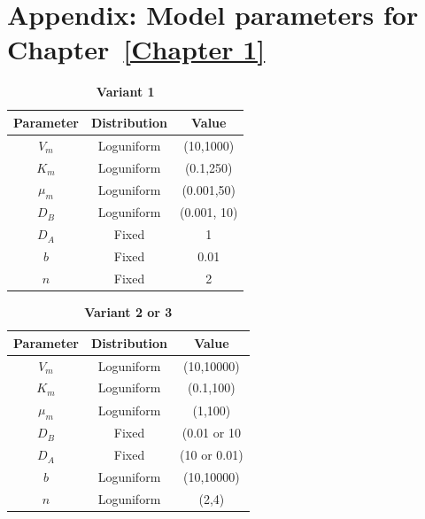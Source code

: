 \appendix
\chapter{Appendix: Model parameters for Chapter~\ref{Chapter 1}}

\begin{table}[H]
    \centering
    \caption{\textbf{Variant 1}}
    \label{tab:variant_1}
    \renewcommand{\arraystretch}{1.3} %
    \begin{tabular}{|c|c|c|}
        \hline
        \textbf{Parameter} & \textbf{Distribution} & \textbf{Value}\\
        \hline
        $V_{m}$ & Loguniform & (10,1000)\\
        \hline
        $K_{m}$ & Loguniform & (0.1,250)\\
        \hline
        $\mu_{m}$ & Loguniform & (0.001,50)\\
        \hline
        $D_{B}$ & Loguniform & (0.001, 10)\\
        \hline
        $D_{A}$ & Fixed & 1\\
        \hline
        $b$ & Fixed & 0.01\\
        \hline
        $n$ & Fixed & 2\\
        \hline
    \end{tabular}
\end{table}


\begin{table}[H]
    \centering
    \caption{\textbf{Variant 2 or 3}}
    \label{tab:variant_2}
    \renewcommand{\arraystretch}{1.3} %
    \begin{tabular}{|c|c|c|}
        \hline
        \textbf{Parameter} & \textbf{Distribution} & \textbf{Value}\\
        \hline
        $V_{m}$ & Loguniform & (10,10000)\\
        \hline
        $K_{m}$ & Loguniform & (0.1,100)\\
        \hline
        $\mu_{m}$ & Loguniform & (1,100)\\
        \hline
        $D_{B}$ & Fixed & (0.01 or 10\\
        \hline
        $D_{A}$ & Fixed & (10 or 0.01)\\
        \hline
        $b$ & Loguniform & (10,10000)\\
        \hline
        $n$ & Loguniform & (2,4)\\
        \hline
    \end{tabular}
\end{table}

